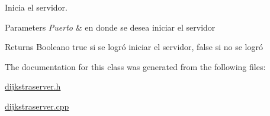 Inicia el servidor. 


\begin{DoxyParams}{Parameters}
{\em Puerto} & en donde se desea iniciar el servidor \\
\hline
\end{DoxyParams}
\begin{DoxyReturn}{Returns}
Booleano true si se logró iniciar el servidor, false si no se logró 
\end{DoxyReturn}


The documentation for this class was generated from the following files\+:\begin{DoxyCompactItemize}
\item 
\hyperlink{dijkstraserver_8h}{dijkstraserver.\+h}\item 
\hyperlink{dijkstraserver_8cpp}{dijkstraserver.\+cpp}\end{DoxyCompactItemize}
